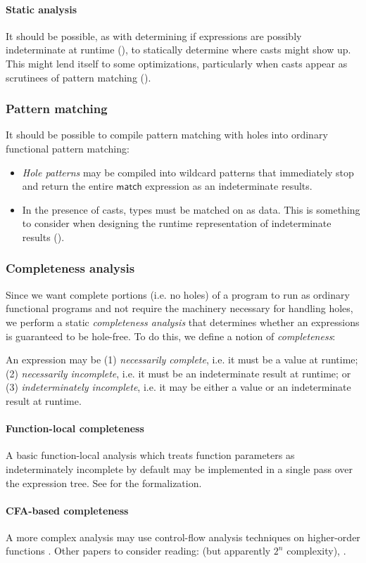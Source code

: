 \documentclass[index.tex]{subfiles}
\begin{document}
\paragraph{Static analysis}
It should be possible, as with determining if expressions are possibly indeterminate at runtime
(), to statically determine where casts might show up. This might lend
itself to some optimizations, particularly when casts appear as scrutinees of pattern matching
().

\subsubsection{Pattern matching}
\label{sec:pattern-matching}
It should be possible to compile pattern matching with holes into ordinary functional pattern
matching:
\begin{itemize}
  \item \emph{Hole patterns} may be compiled into wildcard patterns that immediately stop and return
    the entire $\textsf{match}$ expression as an indeterminate results.
  \item In the presence of casts, types must be matched on as data. This is something to consider
    when designing the runtime representation of indeterminate results
    ().
\end{itemize}

\subsubsection{Completeness analysis}
\label{sec:completeness-analysis}
Since we want complete portions (i.e. no holes) of a program to run as ordinary functional programs
and not require the machinery necessary for handling holes, we perform a static \emph{completeness
analysis} that determines whether an expressions is guaranteed to be hole-free. To do this, we
define a notion of \emph{completeness}:
%
\begin{definition}[name=Completeness, label=completeness]
  An expression may be (1) \emph{necessarily complete}, i.e. it must be a value at runtime; (2)
  \emph{necessarily incomplete}, i.e. it must be an indeterminate result at runtime; or (3)
  \emph{indeterminately incomplete}, i.e. it may be either a value or an indeterminate result at
  runtime.
\end{definition}

\paragraph{Function-local completeness}
A basic function-local analysis which treats function parameters as indeterminately
incomplete by default may be implemented in a single pass over the expression tree. See
 for the formalization.

\paragraph{CFA-based completeness}
A more complex analysis may use control-flow analysis techniques on higher-order functions
\cite{shivers1991, nielson1999}. Other papers to consider reading: \textcite{vardoulaskis2011} (but
apparently $2^{n}$ complexity), \textcite{gilray2016}.
\end{document}
